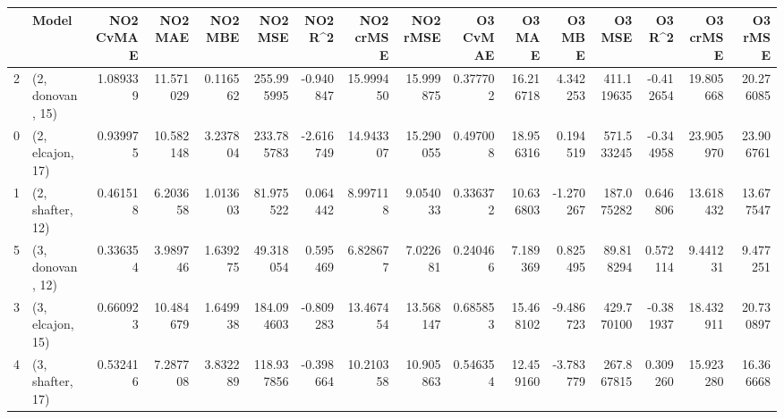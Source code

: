 \begin{tabular}{llrrrrrrrrrrrrrr}
\toprule
{} &             Model &  NO2 CvMAE &    NO2 MAE &   NO2 MBE &     NO2 MSE &   NO2 R\textasciicircum2 &  NO2 crMSE &   NO2 rMSE &  O3 CvMAE &     O3 MAE &    O3 MBE &      O3 MSE &    O3 R\textasciicircum2 &   O3 crMSE &    O3 rMSE \\
\midrule
2 &  (2, donovan, 15) &   1.089339 &  11.571029 &  0.116562 &  255.995995 & -0.940847 &  15.999450 &  15.999875 &  0.377702 &  16.216718 &  4.342253 &  411.119635 & -0.412654 &  19.805668 &  20.276085 \\
0 &  (2, elcajon, 17) &   0.939975 &  10.582148 &  3.237804 &  233.785783 & -2.616749 &  14.943307 &  15.290055 &  0.497008 &  18.956316 &  0.194519 &  571.533245 & -0.344958 &  23.905970 &  23.906761 \\
1 &  (2, shafter, 12) &   0.461518 &   6.203658 &  1.013603 &   81.975522 &  0.064442 &   8.997118 &   9.054033 &  0.336372 &  10.636803 & -1.270267 &  187.075282 &  0.646806 &  13.618432 &  13.677547 \\
5 &  (3, donovan, 12) &   0.336354 &   3.989746 &  1.639275 &   49.318054 &  0.595469 &   6.828677 &   7.022681 &  0.240466 &   7.189369 &  0.825495 &   89.818294 &  0.572114 &   9.441231 &   9.477251 \\
3 &  (3, elcajon, 15) &   0.660923 &  10.484679 &  1.649938 &  184.094603 & -0.809283 &  13.467454 &  13.568147 &  0.685853 &  15.468102 & -9.486723 &  429.770100 & -0.381937 &  18.432911 &  20.730897 \\
4 &  (3, shafter, 17) &   0.532416 &   7.287708 &  3.832289 &  118.937856 & -0.398664 &  10.210358 &  10.905863 &  0.546354 &  12.459160 & -3.783779 &  267.867815 &  0.309260 &  15.923280 &  16.366668 \\
\bottomrule
\end{tabular}
